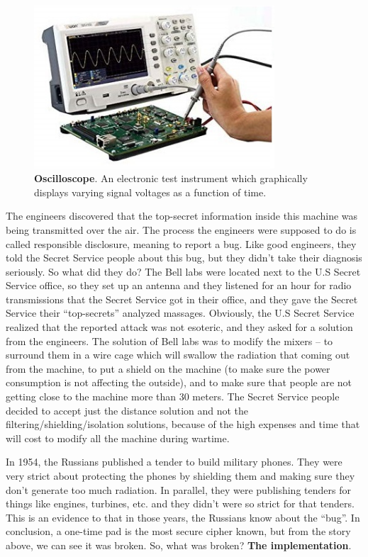 \begin{figure}
    \centering
    \includegraphics[width=0.8\textwidth]{images/ch1_Intro/oscilloscope.jpg}
    \caption{\textbf{Oscilloscope}. An electronic test instrument which graphically displays varying signal voltages as a function of time.}
    \label{fig:Oscillo}
\end{figure}

The engineers discovered\cite{NSAsecret} that the top-secret information inside this machine was being transmitted over the air. The process the engineers were supposed to do is called responsible disclosure, meaning to report a bug. Like good engineers, they told the Secret Service people about this bug, but they didn't take their diagnosis seriously. So what did they do? The Bell labs were located next to the U.S Secret Service office, so they set up an antenna and they listened for an hour for radio transmissions that the Secret Service got in their office, and they gave the Secret Service their “top-secrets” analyzed massages.
Obviously, the U.S Secret Service realized that the reported attack was not esoteric, and they asked for a solution from the engineers. The solution of Bell labs was to modify the mixers – to surround them in a wire cage which will swallow the radiation that coming out from the machine, to put a shield on the machine (to make sure the power consumption is not affecting the outside), and to make sure that people are not getting close to the machine more than 30 meters. The Secret Service people decided to accept just the distance solution and not the filtering/shielding/isolation solutions, because of the high expenses and time that will cost to modify all the machine during wartime.

In 1954, the Russians published a tender to build military phones. They were very strict about protecting the phones by shielding them and making sure they don’t generate too much radiation. In parallel, they were publishing tenders for things like engines, turbines, etc. and they didn't were so strict for that tenders. This is an evidence to that in those years, the Russians know about the “bug”.
In conclusion, a one-time pad is the most secure cipher known, but from the story above, we can see it was broken. So, what was broken? \textbf{The implementation}.

